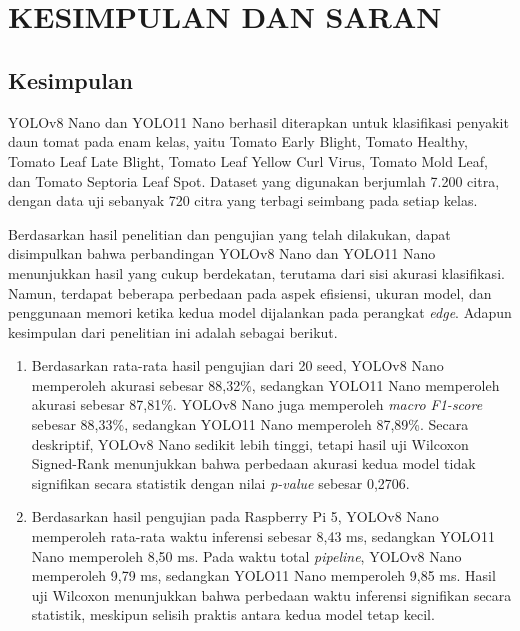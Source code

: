\chapter[KESIMPULAN DAN SARAN]{\\ KESIMPULAN DAN SARAN}

\section{Kesimpulan}
\begin{sectioncontent}
    \hspace{\parindent}YOLOv8 Nano dan YOLO11 Nano berhasil diterapkan untuk klasifikasi penyakit daun tomat pada enam kelas, yaitu Tomato Early Blight, Tomato Healthy, Tomato Leaf Late Blight, Tomato Leaf Yellow Curl Virus, Tomato Mold Leaf, dan Tomato Septoria Leaf Spot. Dataset yang digunakan berjumlah 7.200 citra, dengan data uji sebanyak 720 citra yang terbagi seimbang pada setiap kelas.
    
    Berdasarkan hasil penelitian dan pengujian yang telah dilakukan, dapat disimpulkan bahwa perbandingan YOLOv8 Nano dan YOLO11 Nano menunjukkan hasil yang cukup berdekatan, terutama dari sisi akurasi klasifikasi. Namun, terdapat beberapa perbedaan pada aspek efisiensi, ukuran model, dan penggunaan memori ketika kedua model dijalankan pada perangkat \textit{edge}. Adapun kesimpulan dari penelitian ini adalah sebagai berikut.
    \begin{enumerate}[leftmargin=0.75cm,label=\arabic*.]
        \item Berdasarkan rata-rata hasil pengujian dari 20 seed, YOLOv8 Nano memperoleh akurasi sebesar 88,32\%, sedangkan YOLO11 Nano memperoleh akurasi sebesar 87,81\%. YOLOv8 Nano juga memperoleh \textit{macro F1-score} sebesar 88,33\%, sedangkan YOLO11 Nano memperoleh 87,89\%. Secara deskriptif, YOLOv8 Nano sedikit lebih tinggi, tetapi hasil uji Wilcoxon Signed-Rank menunjukkan bahwa perbedaan akurasi kedua model tidak signifikan secara statistik dengan nilai \textit{p-value} sebesar 0,2706.

        \item Berdasarkan hasil pengujian pada Raspberry Pi 5, YOLOv8 Nano memperoleh rata-rata waktu inferensi sebesar 8,43 ms, sedangkan YOLO11 Nano memperoleh 8,50 ms. Pada waktu total \textit{pipeline}, YOLOv8 Nano memperoleh 9,79 ms, sedangkan YOLO11 Nano memperoleh 9,85 ms. Hasil uji Wilcoxon menunjukkan bahwa perbedaan waktu inferensi signifikan secara statistik, meskipun selisih praktis antara kedua model tetap kecil.


\end{enumerate}
\end{sectioncontent}
